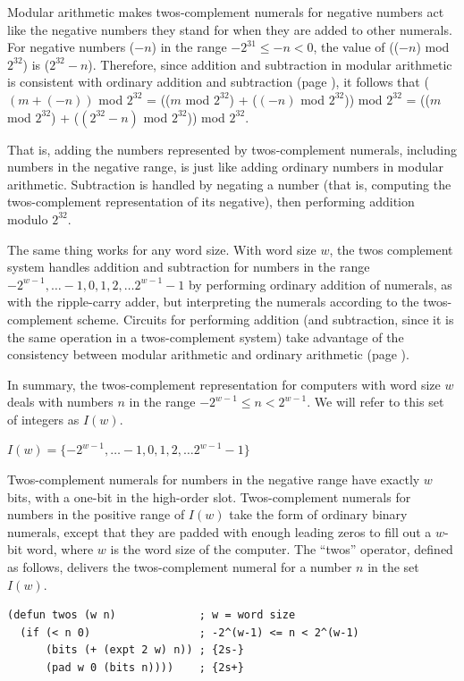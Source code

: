 Modular arithmetic makes twos-complement numerals
for negative numbers act like the negative numbers they stand for
when they are added to other numerals.
For negative numbers ($-n$) in the range $-2^{31} \le -n < 0$,
the value of (($-n$) mod $2^{32}$) is ($2^{32}-n$).
Therefore, since addition and subtraction
in modular arithmetic is consistent with ordinary addition and subtraction
(page \pageref{modular-arithmetic}), it follows that
  ($(m+(-n))$ mod $2^{32}$
= (($m$ mod $2^{32}$) + ($(-n)$ mod $2^{32}$)) mod $2^{32}$
= (($m$ mod $2^{32}$) + ($(2^{32} - n)$ mod $2^{32}$)) mod $2^{32}$.

That is, adding the numbers represented by twos-complement
numerals, including numbers in the negative range,
is just like adding ordinary numbers in modular arithmetic.
Subtraction is handled by negating a number
(that is, computing the twos-complement representation
of its negative), then performing addition modulo $2^{32}$.

The same thing works for any word size.
With word size $w$, the twos complement system
handles addition and subtraction for numbers
in the range $-2^{w-1}, \dots -1, 0, 1, 2, \dots 2^{w-1}-1$
by performing ordinary addition of numerals,
as with the ripple-carry adder, but interpreting
the numerals according to the twos-complement scheme.
Circuits for performing addition (and subtraction, since
it is the same operation in a twos-complement system)
take advantage of the consistency between modular arithmetic
and ordinary arithmetic (page \pageref{modular-arithmetic}).

In summary, the twos-complement representation for computers with
word size $w$ deals with numbers $n$ in the range
$-2^{w-1} \leq n < 2^{w-1}$.
We will refer to this set of integers as $I(w)$.
\label{def-Iw}
\begin{center}
$I(w) = \{-2^{w-1}, \dots -1, 0, 1, 2, \dots 2^{w-1}-1\}$
\end{center}

Twos-complement numerals for numbers in the negative range
have exactly $w$ bits, with a one-bit in the high-order slot.
Twos-complement numerals for numbers in the positive range of $I(w)$
take the form of ordinary binary numerals, except that
they are padded with enough leading zeros
to fill out a $w$-bit word, where $w$ is the word size of the computer.
The ``twos'' operator, defined as follows, delivers the twos-complement numeral
for a number $n$ in the set $I(w)$.

\label{twos-defun}
\begin{Verbatim}
(defun twos (w n)             ; w = word size
  (if (< n 0)                 ; -2^(w-1) <= n < 2^(w-1)
      (bits (+ (expt 2 w) n)) ; {2s-}
      (pad w 0 (bits n))))    ; {2s+}
\end{Verbatim}

